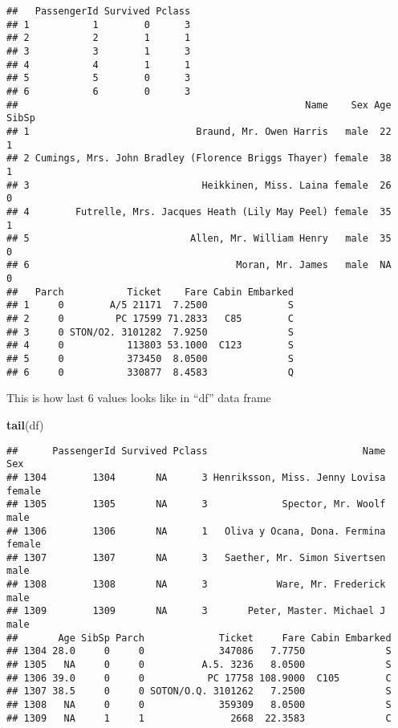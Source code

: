 \documentclass[]{article}
\newenvironment{Shaded}{\begin{snugshade}}{\end{snugshade}}
\newcommand{\KeywordTok}[1]{\textcolor[rgb]{0.13,0.29,0.53}{\textbf{#1}}}
\newcommand{\NormalTok}[1]{#1}
\begin{document}
\begin{verbatim}
##   PassengerId Survived Pclass
## 1           1        0      3
## 2           2        1      1
## 3           3        1      3
## 4           4        1      1
## 5           5        0      3
## 6           6        0      3
##                                                  Name    Sex Age SibSp
## 1                             Braund, Mr. Owen Harris   male  22     1
## 2 Cumings, Mrs. John Bradley (Florence Briggs Thayer) female  38     1
## 3                              Heikkinen, Miss. Laina female  26     0
## 4        Futrelle, Mrs. Jacques Heath (Lily May Peel) female  35     1
## 5                            Allen, Mr. William Henry   male  35     0
## 6                                    Moran, Mr. James   male  NA     0
##   Parch           Ticket    Fare Cabin Embarked
## 1     0        A/5 21171  7.2500              S
## 2     0         PC 17599 71.2833   C85        C
## 3     0 STON/O2. 3101282  7.9250              S
## 4     0           113803 53.1000  C123        S
## 5     0           373450  8.0500              S
## 6     0           330877  8.4583              Q
\end{verbatim}

This is how last 6 values looks like in ``df'' data frame

\begin{Shaded}
\begin{Highlighting}[]
\KeywordTok{tail}\NormalTok{(df)}
\end{Highlighting}
\end{Shaded}

\begin{verbatim}
##      PassengerId Survived Pclass                           Name    Sex
## 1304        1304       NA      3 Henriksson, Miss. Jenny Lovisa female
## 1305        1305       NA      3             Spector, Mr. Woolf   male
## 1306        1306       NA      1   Oliva y Ocana, Dona. Fermina female
## 1307        1307       NA      3   Saether, Mr. Simon Sivertsen   male
## 1308        1308       NA      3            Ware, Mr. Frederick   male
## 1309        1309       NA      3       Peter, Master. Michael J   male
##       Age SibSp Parch             Ticket     Fare Cabin Embarked
## 1304 28.0     0     0             347086   7.7750              S
## 1305   NA     0     0          A.5. 3236   8.0500              S
## 1306 39.0     0     0           PC 17758 108.9000  C105        C
## 1307 38.5     0     0 SOTON/O.Q. 3101262   7.2500              S
## 1308   NA     0     0             359309   8.0500              S
## 1309   NA     1     1               2668  22.3583              C
\end{verbatim}
\end{document}
